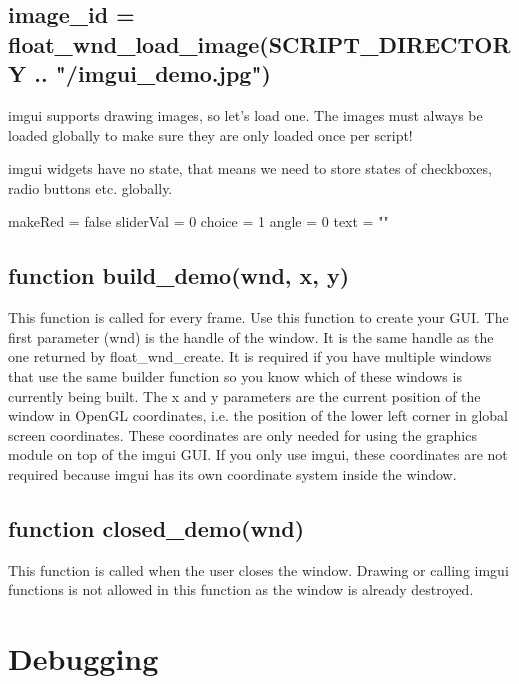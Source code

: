 \documentclass[11pt,parskip=half,a4paper]{scrartcl}
\begin{document}
\newpage

\subsection{image\_id = float\_wnd\_load\_image(SCRIPT\_DIRECTORY .. "/imgui\_demo.jpg")}

imgui supports drawing images, so let's load one. The images must always be loaded globally to make sure they are only loaded once per script!

imgui widgets have no state, that means we need to store states of checkboxes, radio buttons etc. globally.

makeRed = false
\newline
sliderVal = 0
\newline
choice = 1
\newline
angle = 0
\newline
text = ""

\subsection{function build\_demo(wnd, x, y)}

This function is called for every frame. Use this function to create your GUI. The first parameter (wnd)
is the handle of the window. It is the same handle as the one returned by float\_wnd\_create. It is required if you have multiple windows that use the same builder function so you know which of these windows is currently being built. The x and y parameters are the current position of the window in OpenGL coordinates, i.e. the position of the lower left corner in global screen coordinates. These coordinates are only needed for using the graphics module on top of the imgui GUI. If you only use imgui, these coordinates are not required because imgui has its own coordinate system inside the window.

\subsection{function closed\_demo(wnd)}

This function is called when the user closes the window. Drawing or calling imgui functions is not allowed in this function as the window is already destroyed.


\newpage
\section{Debugging}
\end{document}
